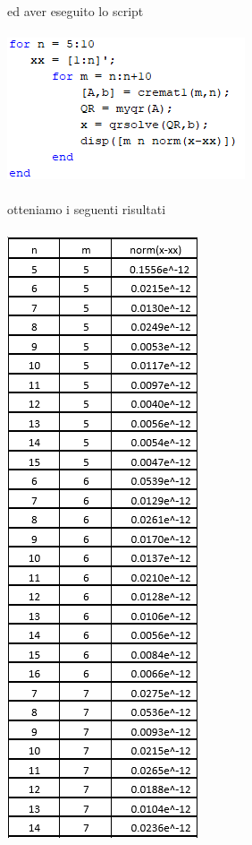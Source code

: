 ed aver eseguito lo script\\~\\
\includegraphics[width=.5\linewidth]{img/ex13.png}\\~\\
otteniamo i seguenti risultati
\\~\\
\includegraphics[width=.5\linewidth]{img/tabella13x1.png}\newpage
